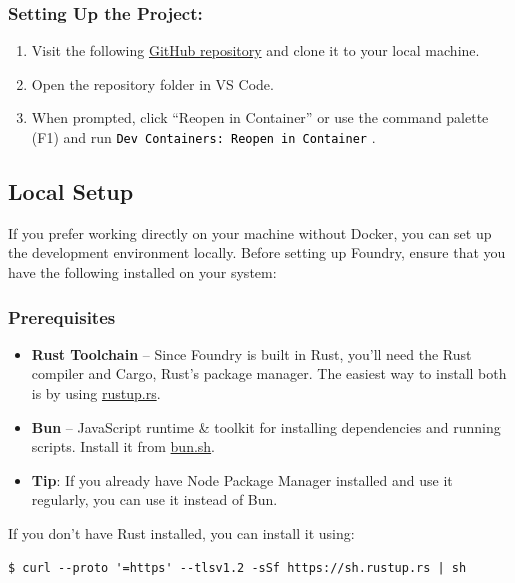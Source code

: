 \documentclass[12pt]{article}
\newcommand{\codegrey}[1]{%
  \texttt{\colorbox{black!4}{\textcolor{black}{#1}}}%
}
\begin{document}
\subsubsection*{Setting Up the Project:}

\begin{enumerate}
    \item Visit the following
          \href{https://github.com/radovluk/Smart-Contract-Exercise/tree/main/09-Vulnerabilities-Detection/task/task-code}{GitHub
              repository} and clone it to your local machine.
    \item Open the repository folder in VS Code.
    \item When prompted, click ``Reopen in Container'' or use the command palette (F1)
          and run \codegrey{Dev Containers: Reopen in Container}.
\end{enumerate}

\subsection{Local Setup}

If you prefer working directly on your machine without Docker, you can set up
the development environment locally. Before setting up Foundry, ensure that you
have the following installed on your system:

\subsubsection*{Prerequisites}
\begin{itemize}
     \item \textbf{Rust Toolchain} -- Since Foundry is built in Rust, you'll need the Rust compiler and Cargo, Rust's package manager. The easiest way to install both is by using \href{https://rustup.rs/}{rustup.rs}.
        \item \textbf{Bun} -- JavaScript runtime \& toolkit for installing dependencies and running scripts. Install it from \href{https://bun.sh/}{bun.sh}.
        \item \textbf{Tip}: If you already have Node Package Manager installed and use it regularly, you can use it instead of Bun.
\end{itemize}

\noindent
If you don't have Rust installed, you can install it using:

\begin{verbatim}
$ curl --proto '=https' --tlsv1.2 -sSf https://sh.rustup.rs | sh
\end{verbatim}
\end{document}
